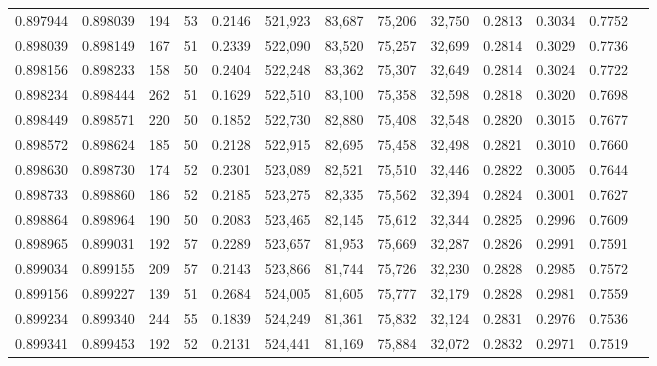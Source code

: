 \begin{tabular}{rrrrrrrrrrrrr}
0.897944 & 0.898039 &   194 &  53 &                                     0.2146 & 521,923 &  83,687 &  75,206 &  32,750 & 0.2813 & 0.3034 & 0.7752 \\
0.898039 & 0.898149 &   167 &  51 &                                     0.2339 & 522,090 &  83,520 &  75,257 &  32,699 & 0.2814 & 0.3029 & 0.7736 \\
0.898156 & 0.898233 &   158 &  50 &                                     0.2404 & 522,248 &  83,362 &  75,307 &  32,649 & 0.2814 & 0.3024 & 0.7722 \\
0.898234 & 0.898444 &   262 &  51 &                                     0.1629 & 522,510 &  83,100 &  75,358 &  32,598 & 0.2818 & 0.3020 & 0.7698 \\
0.898449 & 0.898571 &   220 &  50 &                                     0.1852 & 522,730 &  82,880 &  75,408 &  32,548 & 0.2820 & 0.3015 & 0.7677 \\
0.898572 & 0.898624 &   185 &  50 &                                     0.2128 & 522,915 &  82,695 &  75,458 &  32,498 & 0.2821 & 0.3010 & 0.7660 \\
0.898630 & 0.898730 &   174 &  52 &                                     0.2301 & 523,089 &  82,521 &  75,510 &  32,446 & 0.2822 & 0.3005 & 0.7644 \\
0.898733 & 0.898860 &   186 &  52 &                                     0.2185 & 523,275 &  82,335 &  75,562 &  32,394 & 0.2824 & 0.3001 & 0.7627 \\
0.898864 & 0.898964 &   190 &  50 &                                     0.2083 & 523,465 &  82,145 &  75,612 &  32,344 & 0.2825 & 0.2996 & 0.7609 \\
0.898965 & 0.899031 &   192 &  57 &                                     0.2289 & 523,657 &  81,953 &  75,669 &  32,287 & 0.2826 & 0.2991 & 0.7591 \\
0.899034 & 0.899155 &   209 &  57 &                                     0.2143 & 523,866 &  81,744 &  75,726 &  32,230 & 0.2828 & 0.2985 & 0.7572 \\
0.899156 & 0.899227 &   139 &  51 &                                     0.2684 & 524,005 &  81,605 &  75,777 &  32,179 & 0.2828 & 0.2981 & 0.7559 \\
0.899234 & 0.899340 &   244 &  55 &                                     0.1839 & 524,249 &  81,361 &  75,832 &  32,124 & 0.2831 & 0.2976 & 0.7536 \\
0.899341 & 0.899453 &   192 &  52 &                                     0.2131 & 524,441 &  81,169 &  75,884 &  32,072 & 0.2832 & 0.2971 & 0.7519 \\

\end{tabular}
